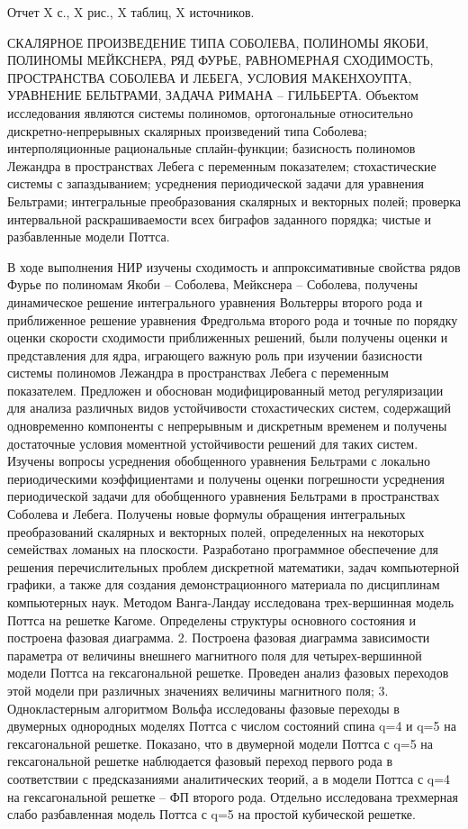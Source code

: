 \Referat %

Отчет X с., X рис., X таблиц, X источников.

\MakeUppercase{скалярное произведение типа Соболева, полиномы Якоби, полиномы Мейкснера, ряд Фурье, равномерная сходимость, пространства Соболева и Лебега, условия Макенхоупта, уравнение Бельтрами, задача Римана -- Гильберта.
}
Объектом исследования являются системы полиномов, ортогональные относительно дискретно-непрерывных скалярных произведений типа Соболева; интерполяционные рациональные сплайн-функции;
базисность полиномов Лежандра в пространствах Лебега с переменным показателем;
стохастические системы с запаздыванием;
усреднения периодической задачи для уравнения Бельтрами;
интегральные преобразования скалярных и векторных полей;
проверка интервальной раскрашиваемости всех биграфов заданного порядка;
чистые и разбавленные модели Поттса.

В ходе выполнения НИР изучены сходимость и аппроксимативные свойства рядов Фурье по полиномам Якоби -- Соболева, Мейкснера -- Соболева,
получены динамическое решение интегрального уравнения Вольтерры второго рода и приближенное решение уравнения Фредгольма второго рода и точные по порядку оценки скорости сходимости приближенных решений,
были получены оценки и представления для ядра, играющего важную роль при изучении базисности системы полиномов Лежандра в пространствах Лебега с переменным показателем.
Предложен и обоснован модифицированный метод регуляризации для анализа различных видов устойчивости стохастических систем, содержащий одновременно компоненты с непрерывным и дискретным временем и получены достаточные условия моментной устойчивости решений для таких систем.
Изучены вопросы усреднения обобщенного уравнения Бельтрами с локально периодическими коэффициентами и получены оценки погрешности усреднения периодической задачи для обобщенного уравнения Бельтрами в пространствах Соболева и Лебега.
Получены новые формулы обращения интегральных преобразований скалярных и векторных полей, определенных на некоторых семействах ломаных на плоскости.
Разработано программное обеспечение для решения перечислительных проблем дискретной математики, задач компьютерной графики, а также для создания демонстрационного материала по дисциплинам компьютерных наук.
Методом Ванга-Ландау исследована трех-вершинная
модель Поттса на решетке Кагоме. Определены структуры основного состояния и построена
фазовая диаграмма. 2. Построена фазовая диаграмма зависимости параметра от величины внешнего
магнитного поля для четырех-вершинной модели Поттса на гексагональной решетке. Проведен
анализ фазовых переходов этой модели при различных значениях величины магнитного поля; 3.
Однокластерным алгоритмом Вольфа исследованы фазовые переходы в двумерных однородных
моделях Поттса с числом состояний спина q=4 и q=5 на гексагональной решетке. Показано, что в
двумерной модели Поттса с q=5 на гексагональной решетке наблюдается фазовый переход
первого рода в соответствии с предсказаниями аналитических теорий, а в модели Поттса с q=4 на гексагональной решетке – ФП второго рода.
Отдельно исследована трехмерная слабо разбавленная модель Поттса с q=5 на простой кубической решетке. 


